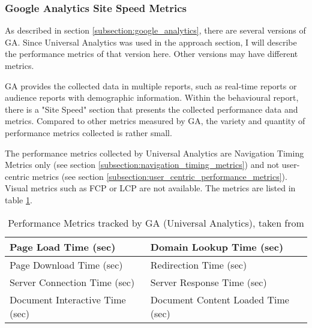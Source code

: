


\subsubsection{Google Analytics Site Speed Metrics} %
\label{subsubsection:ga_metrics}

As described in section \ref{subsection:google_analytics}, there are several versions of GA.
Since Universal Analytics was used in the approach section, I will describe the performance metrics of that version here.
Other versions may have different metrics.


GA provides the collected data in multiple reports, such as real-time reports or audience reports with demographic information.
Within the behavioural report, there is a "Site Speed" section that presents the collected performance data and metrics.
Compared to other metrics measured by GA, the variety and quantity of performance metrics collected is rather small.


The performance metrics collected by Universal Analytics are Navigation Timing Metrics only (see section \ref{subsection:navigation_timing_metrics}) and not user-centric metrics (see section \ref{subsection:user_centric_performance_metrics}).
Visual metrics such as FCP or LCP are not available.
The metrics are listed in table \ref{table:ga_metrics}.

\begin{table}[h]
	\small
	\centering
	\begin{tabular}{ | l | l |}
	\hline
	Page Load Time (sec) & Domain Lookup Time (sec) \\
	\hline
	Page Download Time (sec) & Redirection Time (sec) \\
	\hline
	Server Connection Time (sec) & Server Response Time (sec) \\
	\hline
	Document Interactive Time (sec) & Document Content Loaded Time (sec) \\
	\hline
	\end{tabular}
	\medskip
	\caption[Performance Metrics tracked by GA (Universal Analytics)]{Performance Metrics tracked by GA (Universal Analytics), taken from } %
	\label{table:ga_metrics}
\end{table}


